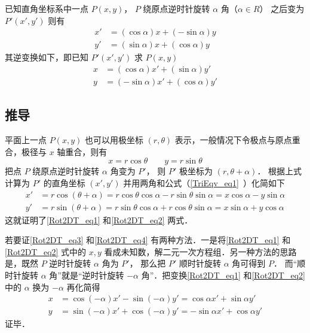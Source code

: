 

已知直角坐标系中一点 $P(x,y)$， $P$ 绕原点逆时针旋转 $\alpha $ 角（$\alpha  \in R$） 之后变为 $P'(x',y')$ 则有
\begin{align}\label{Rot2DT_eq1}
x' &= (\cos \alpha)x + (- \sin \alpha)y \\
\label{Rot2DT_eq2}
y' &= (\sin \alpha)x + (\cos \alpha)y
\end{align}
其逆变换如下，即已知 $P'(x',y')$ 求 $P(x,y)$ 
\begin{align}\label{Rot2DT_eq3}
x &= ( \cos \alpha  )x' + ( \sin \alpha  )y' \\
\label{Rot2DT_eq4}
y &= ( - \sin \alpha  )x' + ( \cos \alpha )y'
\end{align}

\subsection{推导}

平面上一点 $P(x,y)$ 也可以用极坐标 $(r, \theta)$ 表示，一般情况下令极点与原点重合，极径与 $x$ 轴重合，则有
\begin{equation}
x = r\cos \theta \qquad y = r\sin \theta 
\end{equation}     
把点 $P$ 绕原点逆时针旋转 $\alpha $ 角变为 $P'$， 则 $P'$ 极坐标为 $(r, \theta  + \alpha)$． 根据上式计算为 $P'$ 的直角坐标 $(x', y')$ 并用两角和公式（\autoref{TriEqv_eq1}~）化简如下
\begin{align}
x' &= r\cos(\theta  + \alpha) = r\cos\theta \cos\alpha  - r\sin\theta \sin\alpha  = x\cos\alpha  - y\sin\alpha \\
y' &= r\sin(\theta  + \alpha) = r\sin\theta \cos\alpha  + r\cos\theta \sin\alpha  = x\sin\alpha  + y\cos\alpha 
\end{align} 
这就证明了\autoref{Rot2DT_eq1} 和\autoref{Rot2DT_eq2} 两式．

若要证\autoref{Rot2DT_eq3} 和\autoref{Rot2DT_eq4} 有两种方法．一是将\autoref{Rot2DT_eq1} 和\autoref{Rot2DT_eq2} 式中的 $x, y$ 看成未知数，解二元一次方程组．另一种方法的思路是，既然 $P$ 逆时针旋转 $\alpha $ 角为 $P'$， 那么把 $P'$ 顺时针旋转 $\alpha$ 角可得到 $P$． 而“顺时针旋转 $\alpha$ 角”就是“逆时针旋转 $-\alpha $ 角”．把变换\autoref{Rot2DT_eq1} 和\autoref{Rot2DT_eq2} 中的 $\alpha$ 换为 $-\alpha$ 再化简得
 \begin{align}
x &= \cos(-\alpha) x' - \sin(-\alpha) y' = \cos\alpha x' + \sin\alpha y'\\
y &= \sin(-\alpha) x' + \cos(-\alpha) y' =  -\sin\alpha x' + \cos\alpha y'
\end{align}
证毕．
